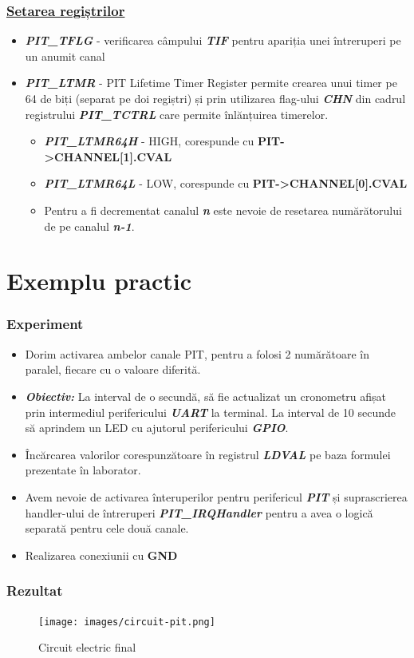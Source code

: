 \documentclass[xcolor={table}]{beamer}
\begin{document}
			\begin{frame}
	    \frametitle{\href{https://github.com/undacmic/MCULabs/blob/main/Resurse/FRDM-KL25Z_ReferenceManual.pdf}{Setarea regiștrilor}}
	    \begin{itemize}
	        \item \textbf{\textit{PIT\_TFLG}} - verificarea câmpului \textbf{\textit{TIF}} pentru apariția unei întreruperi pe un anumit canal
	        \item \textbf{\textit{PIT\_LTMR}} - PIT Lifetime Timer Register permite crearea unui timer pe 64 de biți (separat pe doi regiștri) și prin utilizarea flag-ului \textbf{\textit{CHN}} din cadrul registrului \textbf{\textit{PIT\_TCTRL}} care permite înlănțuirea timerelor.
	        \begin{itemize}
	            \item \textbf{\textit{PIT\_LTMR64H}} - HIGH, corespunde cu \textbf{PIT->CHANNEL[1].CVAL}
	            \item \textbf{\textit{PIT\_LTMR64L}} - LOW, corespunde cu \textbf{PIT->CHANNEL[0].CVAL}
	            \item Pentru a fi decrementat canalul \textbf{\textit{n}} este nevoie de resetarea numărătorului de pe canalul \textbf{\textit{n-1}}.
	        \end{itemize}
	    \end{itemize}
	\end{frame}
	\section{Exemplu practic}
	\begin{frame}
	    \frametitle{Experiment}
	    \begin{itemize}
	        \item Dorim activarea ambelor canale PIT, pentru a folosi 2 numărătoare în paralel, fiecare cu o valoare diferită.
	        \item \textbf{\textit{Obiectiv: }} La interval de o secundă, să fie actualizat un cronometru afișat prin intermediul perifericului \textbf{\textit{UART}} la terminal. La interval de 10 secunde să aprindem un LED cu ajutorul perifericului \textbf{\textit{GPIO}}.
	        \item Încărcarea valorilor corespunzătoare în registrul \textbf{\textit{LDVAL}} pe baza formulei prezentate în laborator.
	        \item Avem nevoie de activarea înteruperilor pentru perifericul \textbf{\textit{PIT}} și suprascrierea handler-ului de întreruperi  \textbf{\textit{PIT\_IRQHandler}} pentru a avea o logică separată pentru cele două canale.
	        \item Realizarea conexiunii cu \textbf{GND}
	    \end{itemize}
	\end{frame}
		\begin{frame}
	    \frametitle{Rezultat}
	    \begin{figure}
	        \centering
	        \texttt{[image: images/circuit-pit.png]}
	        \caption{Circuit electric final}
	        \label{fig:my_label}
	    \end{figure}
	\end{frame}
	\appendix
\end{document}
